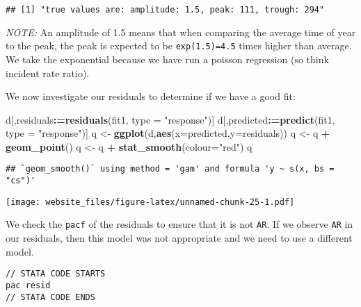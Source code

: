 \documentclass[]{book}
\newenvironment{Shaded}{\begin{snugshade}}{\end{snugshade}}
\newcommand{\KeywordTok}[1]{\textcolor[rgb]{0.13,0.29,0.53}{\textbf{#1}}}
\newcommand{\DataTypeTok}[1]{\textcolor[rgb]{0.13,0.29,0.53}{#1}}
\newcommand{\StringTok}[1]{\textcolor[rgb]{0.31,0.60,0.02}{#1}}
\newcommand{\CommentTok}[1]{\textcolor[rgb]{0.56,0.35,0.01}{\textit{#1}}}
\newcommand{\OperatorTok}[1]{\textcolor[rgb]{0.81,0.36,0.00}{\textbf{#1}}}
\newcommand{\ErrorTok}[1]{\textcolor[rgb]{0.64,0.00,0.00}{\textbf{#1}}}
\newcommand{\NormalTok}[1]{#1}
\begin{document}
\begin{verbatim}
## [1] "true values are: amplitude: 1.5, peak: 111, trough: 294"
\end{verbatim}

\emph{NOTE:} An amplitude of 1.5 means that when comparing the average
time of year to the peak, the peak is expected to be
\texttt{exp(1.5)=4.5} times higher than average. We take the exponential
because we have run a poisson regression (so think incident rate ratio).

\newpage

We now investigate our residuals to determine if we have a good fit:

\begin{Shaded}
\begin{Highlighting}[]
\NormalTok{d[,residuals}\OperatorTok{:}\ErrorTok{=}\KeywordTok{residuals}\NormalTok{(fit1, }\DataTypeTok{type =} \StringTok{"response"}\NormalTok{)]}
\NormalTok{d[,predicted}\OperatorTok{:}\ErrorTok{=}\KeywordTok{predict}\NormalTok{(fit1, }\DataTypeTok{type =} \StringTok{"response"}\NormalTok{)]}
\NormalTok{q <-}\StringTok{ }\KeywordTok{ggplot}\NormalTok{(d,}\KeywordTok{aes}\NormalTok{(}\DataTypeTok{x=}\NormalTok{predicted,}\DataTypeTok{y=}\NormalTok{residuals))}
\NormalTok{q <-}\StringTok{ }\NormalTok{q }\OperatorTok{+}\StringTok{ }\KeywordTok{geom_point}\NormalTok{()}
\NormalTok{q <-}\StringTok{ }\NormalTok{q }\OperatorTok{+}\StringTok{ }\KeywordTok{stat_smooth}\NormalTok{(}\DataTypeTok{colour=}\StringTok{"red"}\NormalTok{)}
\NormalTok{q}
\end{Highlighting}
\end{Shaded}

\begin{verbatim}
## `geom_smooth()` using method = 'gam' and formula 'y ~ s(x, bs = "cs")'
\end{verbatim}

\texttt{[image: website\_files/figure-latex/unnamed-chunk-25-1.pdf]}

\newpage

We check the \texttt{pacf} of the residuals to ensure that it is not
\texttt{AR}. If we observe \texttt{AR} in our residuals, then this model
was not appropriate and we need to use a different model.

\begin{verbatim}
// STATA CODE STARTS
pac resid
// STATA CODE ENDS
\end{verbatim}

\begin{Shaded}
\end{Shaded}
\end{document}
